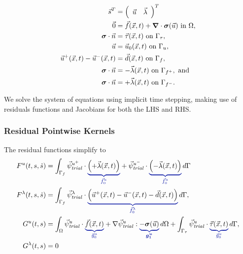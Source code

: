 \begin{align}
  \vec{s}^T &= \left( \begin{array}{cc} \vec{u} & \vec{\lambda} \end{array} \right)^T \\
  \vec{0} &= \vec{f}(\vec{x},t) + \bm{\nabla} \cdot \bm{\sigma}(\vec{u}) \text{ in } \Omega, \\
  \bm{\sigma} \cdot \vec{n} &= \vec{\tau}(\vec{x},t) \text{ on } \Gamma_\tau, \\
  \vec{u} &= \vec{u}_0(\vec{x},t) \text{ on } \Gamma_u, \\
  \vec{u}^+(\vec{x},t) - \vec{u}^-(\vec{x},t) &= \vec{d}(\vec{x},t) \text{ on } \Gamma_f, \\
  \bm{\sigma} \cdot \vec{n} &= -\vec{\lambda}(\vec{x},t) \text{ on }\Gamma_{f^+}, \text{ and} \\
  \bm{\sigma} \cdot \vec{n} &= +\vec{\lambda}(\vec{x},t) \text{ on }\Gamma_{f^-}.
\end{align}

We solve the system of equations using implicit time stepping, making
use of residuals functions and Jacobians for both the LHS and RHS.

\subsubsection{Residual Pointwise Kernels}

The residual functions simplify to
\begin{align}
  F^u(t,s,\dot{s}) &= \int_{\Gamma_{f}} \trialvec[u^+] \cdot \eqnannotate{\left(+\vec{\lambda}(\vec{x},t)\right)}{\vec{f}^u_0}
                     + \trialvec[u^-] \cdot \eqnannotate{\left(-\vec{\lambda}(\vec{x},t)\right)}{\vec{f}^u_0}\, d\Gamma \\
  F^\lambda(t,s,\dot{s}) &= \int_{\Gamma_{f}} \trialvec[\lambda] \cdot \eqnannotate{\left(
    \vec{u}^+(\vec{x},t) - \vec{u}^-(\vec{x},t) - \vec{d}(\vec{x},t) \right)}{\vec{f}^\lambda_0} \, d\Gamma, \\
  G^u(t,s) &=  \int_\Omega \trialvec[u] \cdot \eqnannotate{\vec{f}(\vec{x},t)}{\vec{g}^u_0} + \nabla \trialvec[u] : \eqnannotate{-\tensor{\sigma}(\vec{u})}{\tensor{g^u_1}} \, d\Omega
  + \int_{\Gamma_\tau} \trialvec[u] \cdot \eqnannotate{\vec{\tau}(\vec{x},t)}{\vec{g}^u_0} \, d\Gamma, \\
  G^\lambda(t,s) &= 0
\end{align}

